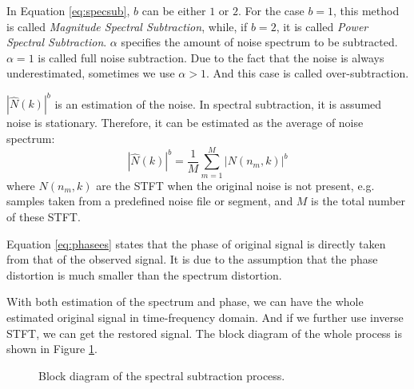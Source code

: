 \documentclass[11pt,a4paper]{report}
\begin{document}
In Equation \ref{eq:specsub}, $b$ can be either $1$ or $2$. For the case $b=1$, this method is called \textit{Magnitude Spectral Subtraction}, while, if $b=2$, it is called \textit{Power Spectral Subtraction}. $\alpha$ specifies the amount of noise spectrum to be subtracted. $\alpha=1$ is called full noise subtraction. Due to the fact that the noise is always underestimated, sometimes we use $\alpha>1$. And this case is called over-subtraction.

$|\hat{N}(k)|^b$ is an estimation of the noise. In spectral subtraction, it is assumed noise is stationary. Therefore, it can be estimated as the average of noise spectrum:
\[ |\hat{N}(k)|^b = \frac{1}{M} \sum_{m=1}^{M} |N(n_m, k)|^b \]
where $N(n_m, k)$ are the STFT when the original noise is not present, e.g. samples taken from a predefined noise file or segment, and $M$ is the total number of these STFT.

Equation \ref{eq:phasees} states that the phase of original signal is directly taken from that of the observed signal. It is due to the assumption that the phase distortion is much smaller than the spectrum distortion.

With both estimation of the spectrum and phase, we can have the whole estimated original signal in time-frequency domain. And if we further use inverse STFT, we can get the restored signal. The block diagram of the whole process is shown in Figure \ref{fig:specsub}.

\begin{figure}[htpb]
\begin{center}
\end{center}
\caption{Block diagram of the spectral subtraction process.}
  \label{fig:specsub}
\end{figure}
\end{document}
